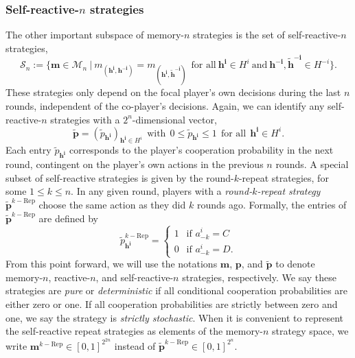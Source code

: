 \documentclass[9pt,twoside,lineno]{pnas-new}
\theoremstyle{plainCl1}
\theoremstyle{plainCl2}
\begin{document}
\noindent
\subsubsection*{Self-reactive-$n$ strategies}
The other important subspace of memory-$n$ strategies is the set of self-reactive-$n$ strategies, 
\begin{equation}
\mathcal{S}_n:=\Big\{ \mathbf{m}\!\in\!\mathcal{M}_n ~\Big|~ m_{(\mathbf{h^i},\mathbf{h^{-i}})}\!=\!m_{(\mathbf{h^i},\mathbf{\tilde h^{-i}})}~~\text{for all}~\mathbf{h^i}\!\in\!H^i~\text{and}~\mathbf{h^{-i}},\mathbf{\tilde h^{-i}}\!\in\!H^{-i}\Big\}.
\end{equation}
These strategies only depend on the focal player's own decisions during the last $n$ rounds, independent of the co-player's decisions. 
Again, we can identify any self-reactive-$n$ strategies with a $2^n$-dimensional vector, 
\begin{equation}
\mathbf{\tilde{p}} = (\tilde{p}_\mathbf{h^{i}})_{\mathbf{h^{i}} \in H^i}  ~~\text{with}~~ 0\!\le\!\tilde p_\mathbf{h^i}\!\le\!1 ~~\text{for all}~~ \mathbf{h^i}\!\in\! H^i.
\end{equation}
Each entry $\tilde{p}_{\mathbf{h^{i}}}$ corresponds to the player's cooperation
probability in the next round, contingent on the player's own actions in
the previous $n$ rounds.
A special subset of self-reactive strategies is given by the round-$k$-repeat strategies, for some $1\le
k\le n$. 
In any given round, players with a {\it round-$k$-repeat strategy} $\mathbf{\tilde p}^{k-\text{Rep}}$ choose the same action as they did $k$ rounds ago. 
Formally, the entries of $\mathbf{\tilde p}^{k-\text{Rep}}$ are defined by
\begin{equation} \label{Eq:Repeat}
\tilde p^{k-\text{Rep}}_\mathbf{h^i} =
\left\{
\begin{array}{l}
1~~ \text{ if } a^i_{-k}\!=\!C\\[0.1cm]
0~~ \text{ if } a^i_{-k}\!=\!D.
\end{array}
\right.
\end{equation}
From this point forward, we will use the notations $\mathbf{m}$, $\mathbf{p}$,
and $\mathbf{\tilde{p}}$ to denote memory-$n$, reactive-$n$, and
self-reactive-$n$ strategies, respectively. 
We say these strategies are {\it pure} or {\it deterministic} if all conditional cooperation probabilities are either zero or one. 
If all cooperation probabilities are strictly between zero and one, we say the strategy is {\it strictly stochastic}. 
When it is convenient to represent the self-reactive repeat strategies as elements of the memory-$n$ strategy space, we write $\mathbf{m}^{k-\text{Rep}}\!\in\![0,1]^{2^{2n}}$ instead of $\mathbf{\tilde p}^{k-\text{Rep}}\!\in\![0,1]^{2^n}$.
\end{document}
